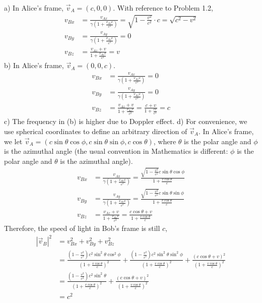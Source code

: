 \documentclass[12pt]{book} %
\numberwithin{equation}{chapter}
\def\c{\gamma}
\begin{document}
\begin{solbox}
a) In Alice's frame, $\vec{v}_{A}=\left(c, 0, 0\right)$. With reference to Problem 1.2,
\begin{align*}
v_{Bx}&=\frac{v_{Ax}}{\c\left(1+\frac{v_{Az}v}{c^2}\right)}=\sqrt{1-\frac{v^2}{c^2}}\cdot c=\sqrt{c^2-v^2}\\
v_{By}&=\frac{v_{Ay}}{\c\left(1+\frac{v_{Az}v}{c^2}\right)}=0\\
v_{Bz}&=\frac{v_{Az}+v}{1+\frac{v_{Az}v}{c^2}}=v
\end{align*}
b) In Alice's frame, $\vec{v}_{A}=\left(0, 0, c\right)$.
\begin{align*}
v_{Bx}&=\frac{v_{Ax}}{\c\left(1+\frac{v_{Az}v}{c^2}\right)}=0\\
v_{By}&=\frac{v_{Ay}}{\c\left(1+\frac{v_{Az}v}{c^2}\right)}=0\\
v_{Bz}&=\frac{v_{Az}+v}{1+\frac{v_{Az}v}{c^2}}=\frac{c+v}{1+\frac{cv}{c^2}}=c
\end{align*}
c) The frequency in (b) is higher due to Doppler effect.\bigskip\newline
d) For convenience, we use spherical coordinates to define an arbitrary direction of $\vec{v}_{A}$.\bigskip\newline
In Alice's frame, we let $\vec{v}_{A}=\left(c\sin\theta\cos\phi, c\sin\theta\sin\phi, c\cos\theta\right)$, where $\theta$ is the polar angle and $\phi$ is the azimuthal angle (the usual convention in Mathematics is different: $\phi$ is the polar angle and $\theta$ is the azimuthal angle).
\begin{align*}
v_{Bx}&=\frac{v_{Ax}}{\c\left(1+\frac{v_{Az}v}{c^2}\right)}=\frac{\sqrt{1-\frac{v^2}{c^2}}c\sin\theta\cos\phi}{1+\frac{v\cos\theta}{c}}\\
v_{By}&=\frac{v_{Ay}}{\c\left(1+\frac{v_{Az}v}{c^2}\right)}=\frac{\sqrt{1-\frac{v^2}{c^2}}c\sin\theta\sin\phi}{1+\frac{v\cos\theta}{c}}\\
v_{Bz}&=\frac{v_{Az}+v}{1+\frac{v_{Az}v}{c^2}}=\frac{c\cos\theta+v}{1+\frac{v\cos\theta}{c}}
\end{align*}
Therefore, the speed of light in Bob's frame is still $c$,
\begin{align*}
\left|\vec{v}_{B}\right|^{2}&=v_{Bx}^{2}+v_{By}^{2}+v_{Bz}^{2}\\
&=\frac{\left(1-\frac{v^{2}}{c^{2}}\right)c^{2}\sin^{2}\theta\cos^{2}\phi}{\left(1+\frac{v\cos\theta}{c}\right)^{2}}+\frac{\left(1-\frac{v^{2}}{c^{2}}\right)c^{2}\sin^{2}\theta\sin^{2}\phi}{\left(1+\frac{v\cos\theta}{c}\right)^{2}}+\frac{\left(c\cos\theta+v\right)^{2}}{\left(1+\frac{v\cos\theta}{c}\right)^{2}}\\
&=\frac{\left(1-\frac{v^{2}}{c^{2}}\right)c^{2}\sin^{2}\theta}{\left(1+\frac{v\cos\theta}{c}\right)^{2}}+\frac{\left(c\cos\theta+v\right)^{2}}{\left(1+\frac{v\cos\theta}{c}\right)^{2}}\\
&=c^{2}
\end{align*}
\end{solbox}
\end{document}
